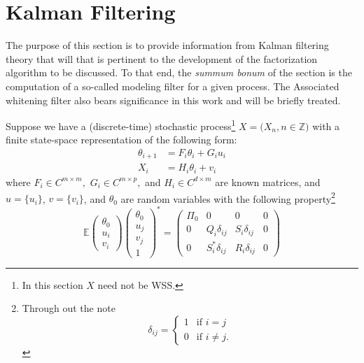 \documentclass[12pt]{amsart}
\newcommand{\E}{\mathbb{E}}
\newcommand{\Z}{\mathbb{Z}}
\begin{document}
\section{Kalman Filtering}
\label{sec: Kalman}

The purpose of this section is to provide information from Kalman filtering theory that will that is pertinent to the development of the factorization algorithm to be discussed. To that end, the \textit{summum bonum} of the section is the computation of a so-called modeling filter for a given process. The Associated whitening filter also bears significance in this work and will be briefly treated.   

Suppose we have a (discrete-time) stochastic process\footnote{
	In this section $X$ need not be WSS.
}
$X = \big(X_n, n \in \Z\big)$ with a finite state-space representation of the following form:
\begin{subequations}
\label{equ: ss}
\begin{align}
\label{equ: ss State}\theta_{i+1} &= F_i\theta_i + G_iu_i \\
\label{equ: ss Obs}X_i &= H_i\theta_i + v_i
\end{align}
\end{subequations}
where $F_i \in C^{m\times m},$ $G_i \in C^{m\times p},$ and $H_i \in C^{d\times m}$ are known matrices, and $u=\{u_i\}$, $v=\{v_i\}$, and $\theta_0$ are random variables with the following property\footnote{
	Through out the note $$\delta_{ij} = \begin{cases} 1 &\text{if }i = j\\ 0 &\text{if }i \ne j.\end{cases}$$
	}
\begin{equation}
\E\begin{pmatrix} \theta_0 \\u_i \\ v_i \end{pmatrix}
\begin{pmatrix} \theta_0 \\u_j \\ v_j\\1 \end{pmatrix}^*
=\begin{pmatrix}
\Pi_0 & 0                & 0              & 0 \\
0     & Q_i\delta_{ij}   & S_i\delta_{ij} & 0 \\
0     & S^*_i\delta_{ij} & R_i\delta_{ij} & 0
\end{pmatrix}
\label{equ: cond}
\end{equation}
\end{document}
